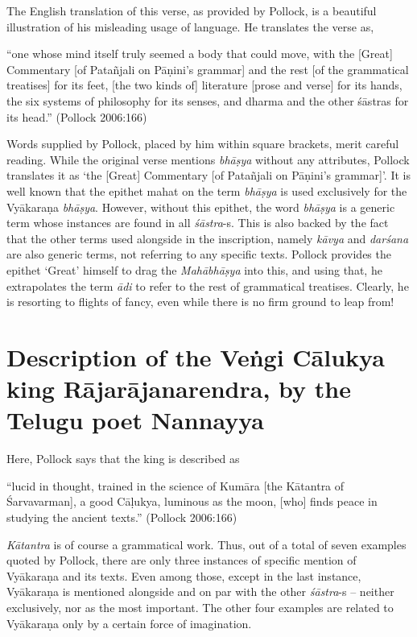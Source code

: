 The English translation of this verse, as provided by Pollock, is a beauti\-ful illustration of his misleading usage of language.  He translates the verse as, 
\begin{myquote}
``one whose mind itself truly seemed a body that could move, with the [Great] Commentary [of Patañjali on Pāṇini’s grammar] and the rest [of the grammatical treatises] for its feet, [the two kinds of] literature [prose and  verse]  for  its  hands,  the  six  systems  of  philosophy  for  its  senses,  and dharma and the other śāstras for its head.'' \hfill (Pollock 2006:166)
\end{myquote}

Words supplied by Pollock, placed by him within square brackets, merit careful reading. While the original verse mentions {\sl bhāṣya} without any attributes, Pollock translates it as `the [Great] Commentary [of Patañjali on Pāṇini's grammar]'. It is well known that the epithet mahat on the term {\sl bhāṣya} is used exclusively for the Vyākaraṇa {\sl bhāṣya}. However, without this epithet, the word {\sl bhāṣya} is a generic term whose instances are found in all {\sl śāstra}-s. This is also backed by the fact that the other terms used alongside in the inscription, namely {\sl kāvya} and {\sl darśana} are also generic terms, not referring to any specific texts. Pollock provides the epithet `Great' himself to drag the {\sl Mahābhāṣya} into this, and using that, he extrapolates the term {\sl ādi} to refer to the rest of grammatical treatises. Clearly, he is resorting to flights of fancy, even while there is no firm ground to leap from!

\section{Description of the Veṅgi Cālukya king Rājarājanarendra, by the Telugu poet Nannayya}\label{chap3-sec7}

Here, Pollock says that the king is described as 
\begin{myquote}
``lucid in thought, trained in the science of Kumāra [the Kātantra of Śarvavarman], a good Cāḷukya, luminous as the moon, [who] finds peace in studying the ancient texts.''
\hfill (Pollock 2006:166)
\end{myquote}

{\sl Kātantra}  is of course a grammatical work. Thus, out of a total of seven examples quoted by Pollock, there are only three instances of specific mention of Vyākaraṇa and its texts. Even among those, except in the last instance, Vyākaraṇa is mentioned alongside and on par with the other {\sl śāstra}-s -- neither exclusively, nor as the most important. The other four examples are related to Vyākaraṇa only by a certain force of imagination. 

